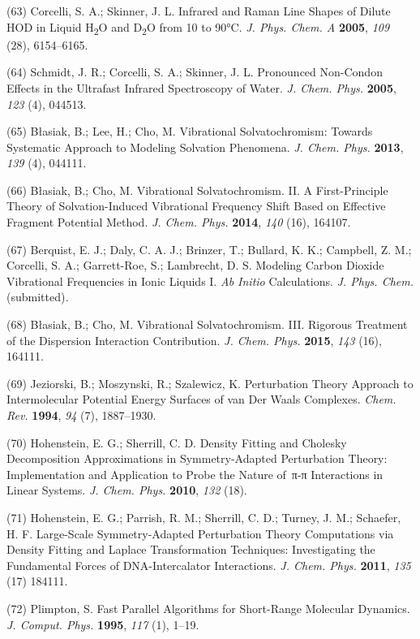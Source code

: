 \documentclass[]{article}
\begin{document}
(63) Corcelli, S. A.; Skinner, J. L. Infrared and Raman Line Shapes of
Dilute HOD in Liquid H\textsubscript{2}O and D\textsubscript{2}O from 10
to 90°C. \emph{J. Phys. Chem. A} \textbf{2005}, \emph{109} (28),
6154--6165.

(64) Schmidt, J. R.; Corcelli, S. A.; Skinner, J. L. Pronounced
Non-Condon Effects in the Ultrafast Infrared Spectroscopy of Water.
\emph{J. Chem. Phys.} \textbf{2005}, \emph{123} (4), 044513.

(65) Błasiak, B.; Lee, H.; Cho, M. Vibrational Solvatochromism: Towards
Systematic Approach to Modeling Solvation Phenomena. \emph{J. Chem.
Phys.} \textbf{2013}, \emph{139} (4), 044111.

(66) Błasiak, B.; Cho, M. Vibrational Solvatochromism. II. A
First-Principle Theory of Solvation-Induced Vibrational Frequency Shift
Based on Effective Fragment Potential Method. \emph{J. Chem. Phys.}
\textbf{2014}, \emph{140} (16), 164107.

(67) Berquist, E. J.; Daly, C. A. J.; Brinzer, T.; Bullard, K. K.;
Campbell, Z. M.; Corcelli, S. A.; Garrett-Roe, S.; Lambrecht, D. S.
Modeling Carbon Dioxide Vibrational Frequencies in Ionic Liquids I.
\emph{Ab Initio} Calculations. \emph{J. Phys. Chem.} (submitted)\emph{.}

(68) Błasiak, B.; Cho, M. Vibrational Solvatochromism. III. Rigorous
Treatment of the Dispersion Interaction Contribution. \emph{J. Chem.
Phys.} \textbf{2015}, \emph{143} (16), 164111.

(69) Jeziorski, B.; Moszynski, R.; Szalewicz, K. Perturbation Theory
Approach to Intermolecular Potential Energy Surfaces of van Der Waals
Complexes. \emph{Chem. Rev.} \textbf{1994}, \emph{94} (7), 1887--1930.

(70) Hohenstein, E. G.; Sherrill, C. D. Density Fitting and Cholesky
Decomposition Approximations in Symmetry-Adapted Perturbation Theory:
Implementation and Application to Probe the Nature of\, π-π Interactions
in Linear Systems. \emph{J. Chem. Phys.} \textbf{2010}, \emph{132} (18).

(71) Hohenstein, E. G.; Parrish, R. M.; Sherrill, C. D.; Turney, J. M.;
Schaefer, H. F. Large-Scale Symmetry-Adapted Perturbation Theory
Computations via Density Fitting and Laplace Transformation Techniques:
Investigating the Fundamental Forces of DNA-Intercalator Interactions.
\emph{J. Chem. Phys.} \textbf{2011}, \emph{135} (17) 184111.

(72) Plimpton, S. Fast Parallel Algorithms for Short-Range Molecular
Dynamics. \emph{J. Comput. Phys.} \textbf{1995}, \emph{117} (1), 1--19.
\end{document}
